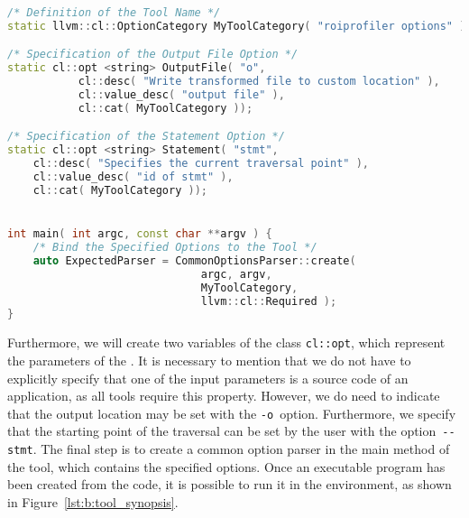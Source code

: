 \begin{lstlisting}[float, language=C++, caption=Code Showing Option Definitions for Creating a \CLANG Tool., label=lst:b:clang_options]
/* Definition of the Tool Name */
static llvm::cl::OptionCategory MyToolCategory( "roiprofiler options" );

/* Specification of the Output File Option */
static cl::opt <string> OutputFile( "o", 
           cl::desc( "Write transformed file to custom location" ),
           cl::value_desc( "output file" ), 
           cl::cat( MyToolCategory ));

/* Specification of the Statement Option */
static cl::opt <string> Statement( "stmt", 
    cl::desc( "Specifies the current traversal point" ),
    cl::value_desc( "id of stmt" ), 
    cl::cat( MyToolCategory ));


int main( int argc, const char **argv ) {
    /* Bind the Specified Options to the Tool */
    auto ExpectedParser = CommonOptionsParser::create( 
                              argc, argv, 
                              MyToolCategory, 
                              llvm::cl::Required );
}
\end{lstlisting}

Furthermore, we will create two variables of the class \lstinline{cl::opt}, which represent the parameters of the \TOOL. It is necessary to mention that we do not have to explicitly specify that one of the input parameters is a source code of an application, as all \LIBTOOLING tools require this property. However, we do need to indicate that the output location may be set with the \lstinline{-o}~option. Furthermore, we specify that the starting point of the traversal can be set by the user with the option~\lstinline{--stmt}. The final step is to create a common option parser in the main method of the tool, which contains the specified options. Once an executable program has been created from the code, it is possible to run it in the \CLANG environment, as shown in Figure~\ref{lst:b:tool_synopsis}.

